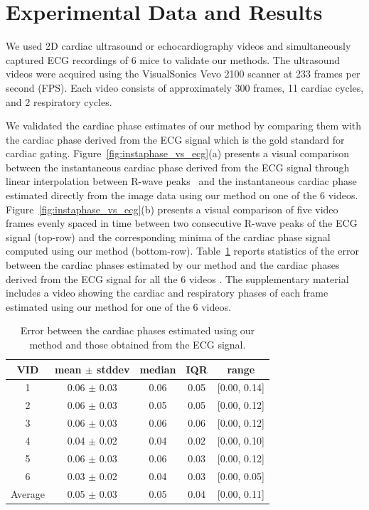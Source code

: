 \documentclass[journal]{IEEEtran}
\newcommand{\rk}[1]{{\color{red}{#1}}}
\begin{document}
\section{Experimental Data and Results}
\label{sec:results}
%
We used 2D cardiac ultrasound or echocardiography videos and simultaneously captured ECG recordings of 6 mice to validate our methods. The ultrasound videos were acquired using the VisualSonics Vevo 2100 scanner at 233 frames per second (FPS). Each video consists of approximately 300 frames, 11 cardiac cycles, and 2 respiratory cycles.

We validated the cardiac phase estimates of our method by comparing them with the cardiac phase derived from the ECG signal which is the gold standard for cardiac gating. Figure~\ref{fig:instaphase_vs_ecg}(a) presents a visual comparison between the instantaneous cardiac phase derived from the ECG signal through linear interpolation between R-wave peaks~\cite{Rosenblum2001,Freund2003} and the instantaneous cardiac phase estimated directly from the image data using our method on one of the 6 videos. Figure~\ref{fig:instaphase_vs_ecg}(b) presents a visual comparison of five video frames evenly spaced in time between two consecutive R-wave peaks of the ECG signal (top-row) and the corresponding minima of the cardiac phase signal computed using our method (bottom-row). Table~\ref{table:phase_estimation_error} reports statistics of the error between the cardiac phases estimated by our method and the cardiac phases derived from the ECG signal for all the 6 videos \rk{where in the phases are in the normalized $[0, 1]$ range}. The supplementary material includes a video showing the cardiac and respiratory phases of each frame estimated using our method for one of the 6 videos.

%	
\begin{table}[h]
\begin{minipage}[t]{0.95\linewidth}
\centering
\caption{Error between the cardiac phases estimated using our method and those obtained from the ECG signal.}
\begin{tabular}{|c|c|c|c|c|}
\hline
VID & mean $\pm$ stddev & median & IQR & range \\ \hline
1 & 0.06 $\pm$ 0.03 & 0.06 & 0.05 & {[}0.00, 0.14{]} \\ \hline
2 & 0.06 $\pm$ 0.03 & 0.05 & 0.05 & {[}0.00, 0.12{]} \\ \hline
3 & 0.06 $\pm$ 0.03 & 0.06 & 0.06 & {[}0.00, 0.12{]} \\ \hline
4 & 0.04 $\pm$ 0.02 & 0.04 & 0.02 & {[}0.00, 0.10{]} \\ \hline
5 & 0.06 $\pm$ 0.03 & 0.06 & 0.03 & {[}0.00, 0.12{]} \\ \hline
6 & 0.03 $\pm$ 0.02 & 0.04 & 0.03 & {[}0.00, 0.05{]} \\ \hline \hline
Average & 0.05 $\pm$ 0.03 & 0.05 & 0.04 & {[}0.00, 0.11{]} \\ \hline
\end{tabular}
\label{table:phase_estimation_error}
\end{minipage}
\end{table}	
%	
	
\end{document}
